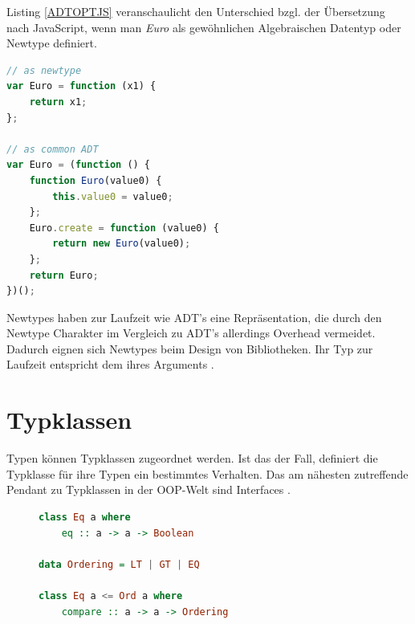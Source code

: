 \documentclass[
12pt,
ngerman,
oneside]
{scrbook} %
\begin{document}
Listing \ref{ADTOPTJS} veranschaulicht den Unterschied bzgl. der Übersetzung nach JavaScript, wenn man \emph{Euro} als gewöhnlichen Algebraischen Datentyp oder Newtype definiert.

\begin{lstlisting}[language=javascript, style=numbered-and-boxed, caption= Übersetzung nach JavaScript von Newtypes, label=ADTOPTJS]
// as newtype
var Euro = function (x1) {
	return x1;
};

// as common ADT
var Euro = (function () {
	function Euro(value0) {
		this.value0 = value0;
	};
	Euro.create = function (value0) {
		return new Euro(value0);
	};
	return Euro;
})();
\end{lstlisting}

Newtypes haben zur Laufzeit wie ADT's eine Repräsentation, die durch den Newtype Charakter im Vergleich zu ADT's allerdings Overhead vermeidet. Dadurch eignen sich Newtypes beim Design von Bibliotheken. Ihr Typ zur Laufzeit entspricht dem ihres Arguments \cite[][S. 146--147]{Freeman17}.

\section{Typklassen}
\label{lbl:Typeclasses}

Typen können Typklassen zugeordnet werden. Ist das der Fall, definiert die Typklasse für ihre Typen ein bestimmtes Verhalten. Das am nähesten zutreffende Pendant zu Typklassen in der OOP-Welt sind Interfaces \cite[Kap. Types and Typeclasses, Abschn. Typeclasses 101]{Haskell11}. 

\begin{figure}
	\begin{lstlisting}[aboveskip=-1em, language=purescript, caption=Beispiel Typklassen, label=TypeClassesPS]
class Eq a where
	eq :: a -> a -> Boolean
	
data Ordering = LT | GT | EQ
	
class Eq a <= Ord a where
	compare :: a -> a -> Ordering
	\end{lstlisting}
\end{figure}
\end{document}
